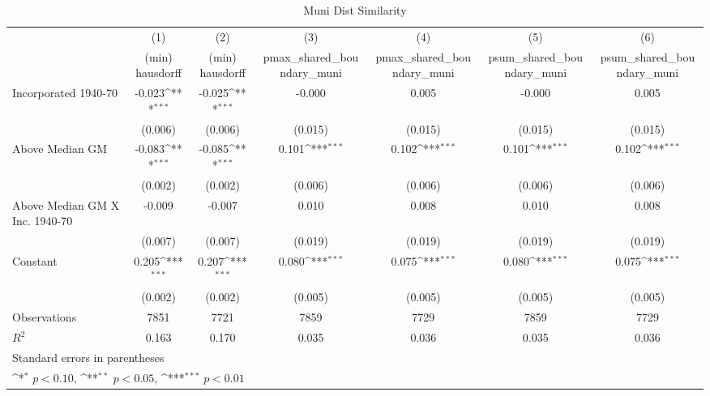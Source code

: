 \begin{table}[htbp]\centering
\def\sym#1{\ifmmode^{#1}\else\(^{#1}\)\fi}
\caption{Muni Dist Similarity}
\begin{tabular}{l*{6}{c}}
\hline\hline
                    &\multicolumn{1}{c}{(1)}&\multicolumn{1}{c}{(2)}&\multicolumn{1}{c}{(3)}&\multicolumn{1}{c}{(4)}&\multicolumn{1}{c}{(5)}&\multicolumn{1}{c}{(6)}\\
                    &\multicolumn{1}{c}{(min) hausdorff}&\multicolumn{1}{c}{(min) hausdorff}&\multicolumn{1}{c}{pmax\_shared\_boundary\_muni}&\multicolumn{1}{c}{pmax\_shared\_boundary\_muni}&\multicolumn{1}{c}{psum\_shared\_boundary\_muni}&\multicolumn{1}{c}{psum\_shared\_boundary\_muni}\\
\hline
Incorporated 1940-70&      -0.023\sym{***}&      -0.025\sym{***}&      -0.000         &       0.005         &      -0.000         &       0.005         \\
                    &     (0.006)         &     (0.006)         &     (0.015)         &     (0.015)         &     (0.015)         &     (0.015)         \\
[1em]
Above Median GM     &      -0.083\sym{***}&      -0.085\sym{***}&       0.101\sym{***}&       0.102\sym{***}&       0.101\sym{***}&       0.102\sym{***}\\
                    &     (0.002)         &     (0.002)         &     (0.006)         &     (0.006)         &     (0.006)         &     (0.006)         \\
[1em]
Above Median GM X Inc. 1940-70&      -0.009         &      -0.007         &       0.010         &       0.008         &       0.010         &       0.008         \\
                    &     (0.007)         &     (0.007)         &     (0.019)         &     (0.019)         &     (0.019)         &     (0.019)         \\
[1em]
Constant            &       0.205\sym{***}&       0.207\sym{***}&       0.080\sym{***}&       0.075\sym{***}&       0.080\sym{***}&       0.075\sym{***}\\
                    &     (0.002)         &     (0.002)         &     (0.005)         &     (0.005)         &     (0.005)         &     (0.005)         \\
\hline
Observations        &        7851         &        7721         &        7859         &        7729         &        7859         &        7729         \\
\(R^{2}\)           &       0.163         &       0.170         &       0.035         &       0.036         &       0.035         &       0.036         \\
\hline\hline
\multicolumn{7}{l}{\footnotesize Standard errors in parentheses}\\
\multicolumn{7}{l}{\footnotesize \sym{*} \(p<0.10\), \sym{**} \(p<0.05\), \sym{***} \(p<0.01\)}\\
\end{tabular}
\end{table}
